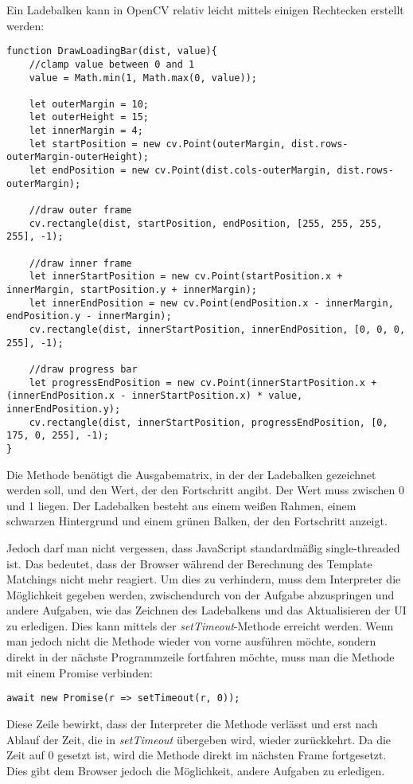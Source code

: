 Ein Ladebalken kann in OpenCV relativ leicht mittels einigen Rechtecken erstellt werden:

\begin{lstlisting}[style=JavaScript]
function DrawLoadingBar(dist, value){
    //clamp value between 0 and 1
    value = Math.min(1, Math.max(0, value));

    let outerMargin = 10;
    let outerHeight = 15;
    let innerMargin = 4;
    let startPosition = new cv.Point(outerMargin, dist.rows-outerMargin-outerHeight);
    let endPosition = new cv.Point(dist.cols-outerMargin, dist.rows-outerMargin);

    //draw outer frame
    cv.rectangle(dist, startPosition, endPosition, [255, 255, 255, 255], -1);

    //draw inner frame
    let innerStartPosition = new cv.Point(startPosition.x + innerMargin, startPosition.y + innerMargin);
    let innerEndPosition = new cv.Point(endPosition.x - innerMargin, endPosition.y - innerMargin);
    cv.rectangle(dist, innerStartPosition, innerEndPosition, [0, 0, 0, 255], -1);

    //draw progress bar
    let progressEndPosition = new cv.Point(innerStartPosition.x + (innerEndPosition.x - innerStartPosition.x) * value, innerEndPosition.y);
    cv.rectangle(dist, innerStartPosition, progressEndPosition, [0, 175, 0, 255], -1);
}
\end{lstlisting}

Die Methode benötigt die Ausgabematrix, in der der Ladebalken gezeichnet werden soll, und den Wert, der den Fortschritt angibt. Der Wert muss zwischen 0 und 1 liegen. Der Ladebalken besteht aus einem weißen Rahmen, einem schwarzen Hintergrund und einem grünen Balken, der den Fortschritt anzeigt.

Jedoch darf man nicht vergessen, dass JavaScript standardmäßig single-threaded ist. Das bedeutet, dass der Browser während der Berechnung des Template Matchings nicht mehr reagiert. Um dies zu verhindern, muss dem Interpreter die Möglichkeit gegeben werden, zwischendurch von der Aufgabe abzuspringen und andere Aufgaben, wie das Zeichnen des Ladebalkens und das Aktualisieren der UI zu erledigen. Dies kann mittels der \textit{setTimeout}-Methode erreicht werden. Wenn man jedoch nicht die Methode wieder von vorne ausführen möchte, sondern direkt in der nächste Programmzeile fortfahren möchte, muss man die Methode mit einem Promise verbinden:

\begin{lstlisting}[style=JavaScript]
await new Promise(r => setTimeout(r, 0));
\end{lstlisting}

Diese Zeile bewirkt, dass der Interpreter die Methode verlässt und erst nach Ablauf der Zeit, die in \textit{setTimeout} übergeben wird, wieder zurückkehrt. Da die Zeit auf 0 gesetzt ist, wird die Methode direkt im nächsten Frame fortgesetzt. Dies gibt dem Browser jedoch die Möglichkeit, andere Aufgaben zu erledigen.